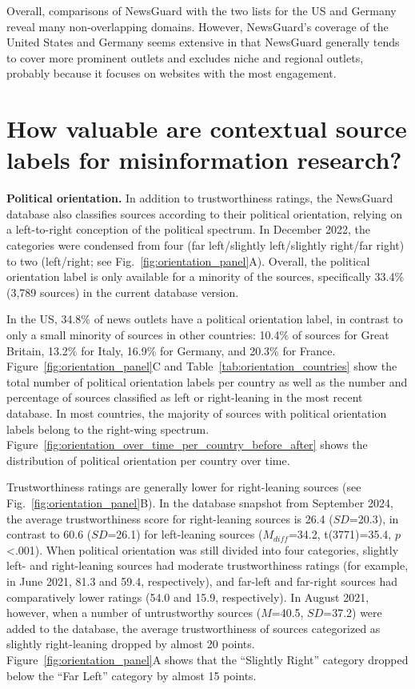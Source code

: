 \documentclass[12pt,twoside]{article}
\begin{document}
Overall, comparisons of NewsGuard with the two lists for the US and Germany reveal many non-overlapping domains.  
However, NewsGuard's coverage of the United States and Germany seems extensive in that NewsGuard generally tends to cover more prominent outlets and excludes niche and regional outlets, probably because it focuses on websites with the most engagement.  


\section{How valuable are contextual source labels for misinformation research?}
\textbf{Political orientation.} 
In addition to trustworthiness ratings, the NewsGuard database also classifies sources according to their political orientation, relying on a left-to-right conception of the political spectrum. 
In December 2022, the categories were condensed from four (far left/slightly left/slightly right/far right) to two (left/right; see Fig.~\ref{fig:orientation_panel}A). 
Overall, the political orientation label is only available for a minority of the sources, specifically 33.4\% (3,789 sources) in the current database version. 

In the US, 34.8\% of news outlets have a political orientation label, in contrast to only a small minority of sources in other countries: 10.4\% of sources for Great Britain, 13.2\% for Italy, 16.9\% for Germany, and 20.3\% for France. 
Figure~\ref{fig:orientation_panel}C and Table~\ref{tab:orientation_countries} show the total number of political orientation labels per country as well as the number and percentage of sources classified as left or right-leaning in the most recent database.
In most countries, the majority of sources with political orientation labels belong to the right-wing spectrum. 
Figure~\ref{fig:orientation_over_time_per_country_before_after} shows the distribution of political orientation per country over time. 

Trustworthiness ratings are generally lower for right-leaning sources (see Fig.~\ref{fig:orientation_panel}B). 
In the database snapshot from September 2024, the average trustworthiness score for right-leaning sources is 26.4 ($SD$=20.3), in contrast to 60.6 ($SD$=26.1) for left-leaning sources ($M_{diff}$=34.2, t(3771)=35.4, $p$<.001).
When political orientation was still divided into four categories, slightly left- and right-leaning sources had moderate trustworthiness ratings (for example, in June 2021, 81.3 and 59.4, respectively), and far-left and far-right sources had comparatively lower ratings (54.0 and 15.9, respectively). 
In August 2021, however, when a number of untrustworthy sources ($M$=40.5, $SD$=37.2) were added to the database, the average trustworthiness of sources categorized as slightly right-leaning dropped by almost 20 points. 
Figure~\ref{fig:orientation_panel}A shows that the ``Slightly Right'' category dropped below the ``Far Left'' category by almost 15 points. 
\end{document}

